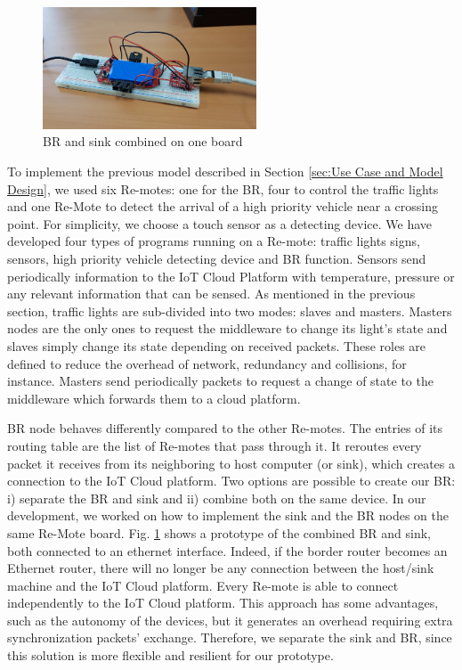 \documentclass[conference]{../../setup/IEEEtran}
\begin{document}
\begin{figure}[!htb]
\centering
\includegraphics[width=2.5in]{res/ethernetRouter.png}
\caption{BR and sink combined on one board}
\label{fig:ethernetRouter.png}
\end{figure}
To implement the previous model described in Section \ref{sec:Use Case and Model Design}, we used six Re-motes: one for the BR, four to control the traffic lights and one Re-Mote to detect the arrival of a high priority vehicle near a crossing point. For simplicity, we choose a touch sensor as a detecting device. We have developed four types of programs running on a Re-mote: traffic lights signs, sensors, high priority vehicle detecting device and BR function. Sensors send periodically information to the IoT Cloud Platform with temperature, pressure or any relevant information that can be sensed. As mentioned in the previous section, traffic lights are sub-divided into two modes: slaves and masters. Masters nodes are the only ones to request the middleware to change its light’s state and slaves simply change its state depending on received packets. These roles are defined to reduce the overhead of network, redundancy and collisions, for instance. Masters send periodically packets to request a change of state to the middleware which forwards them to a cloud platform.




 
BR node behaves differently compared to the other Re-motes. The entries of its routing table are the list of Re-motes that pass through it. It reroutes every packet it receives from its neighboring to host computer (or sink), which  creates a connection to the IoT Cloud platform. Two options are possible to create our BR: i) separate the BR and sink and ii) combine both on the same device. 
In our development, we worked on how to implement the sink and the BR nodes on the same Re-Mote board. Fig. \ref{fig:ethernetRouter.png} shows a prototype of the combined BR and sink, both connected to an ethernet interface. Indeed, if the border router becomes an Ethernet router, there will no longer be any connection between the host/sink machine and the IoT Cloud platform. Every Re-mote is able to connect independently to the IoT Cloud platform. This approach has some advantages, such as the autonomy of the devices, but it generates an overhead requiring extra synchronization packets' exchange. Therefore, we separate the sink and BR, since this solution is more flexible and resilient for our prototype.
\end{document}
